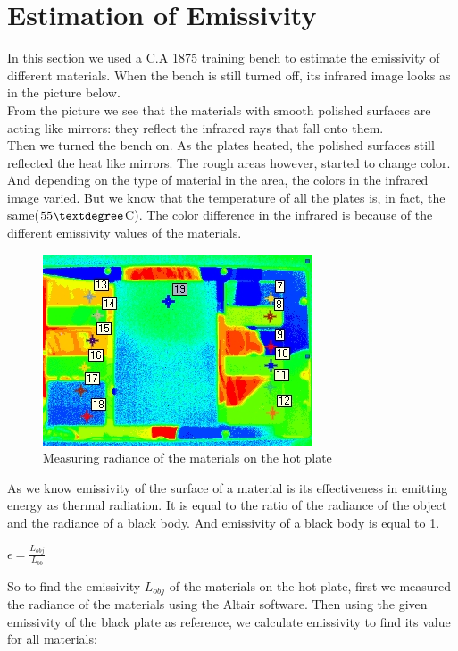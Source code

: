 \documentclass[english]{article}
\begin{document}
\section{Estimation of Emissivity}
In this section we used a C.A 1875 training bench to estimate the emissivity of different materials.
When the bench is still turned off, its infrared image looks as in the picture below.\\
From the picture we see that the materials with smooth polished surfaces are acting like mirrors: they reflect the infrared rays that fall onto them.\\
Then we turned the bench on.
As the plates heated, the polished surfaces still reflected the heat like mirrors.
The rough areas however, started to change color.
And depending on the type of material in the area, the colors in the infrared image varied.
But we know that the temperature of all the plates is, in fact, the same($55\textdegree$C).
The color difference in the infrared is because of the different emissivity values of the materials.\\
\begin{figure}[H]
	\centering
	\includegraphics[width=0.6\linewidth]{Pictures/emiss.jpg}
	\caption{Measuring radiance of the materials on the hot plate}
	\label{fig:six}
\end{figure}
As we know emissivity of the surface of a material is its effectiveness in emitting energy as thermal radiation.
It is equal to the ratio of the radiance of the object and the radiance of a black body. And emissivity of a black body is equal to 1.\\
\begin{center}
$\epsilon = \frac{L_{obj}}{L_{bb}} $
\end{center}
So to find the emissivity $L_{obj}$ of the materials on the hot plate, first we measured the radiance of the materials using the Altair software. 
Then using the given emissivity of the black plate as reference, we calculate emissivity to find its value for all materials:\\
\end{document}
